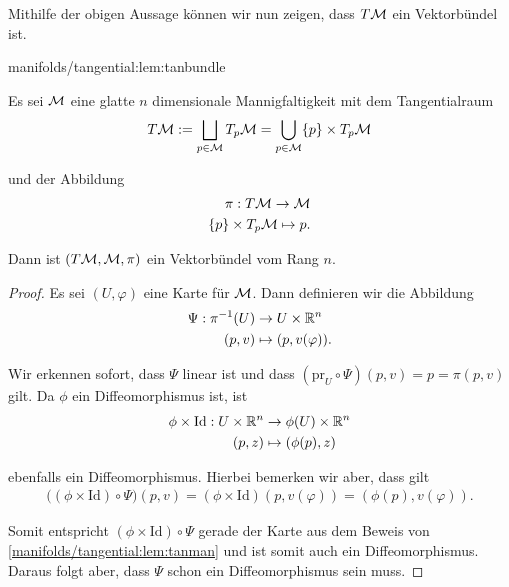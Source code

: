 \par
Mithilfe der obigen Aussage können wir nun zeigen, dass \(T\mathcal{M}\) ein Vektorbündel ist.
\begin{lemma}{}{manifolds/tangential:lem:tanbundle}



\par
Es sei \(\mathcal{M}\) eine glatte \(n\) dimensionale Mannigfaltigkeit mit dem Tangentialraum
\begin{align*}
T\mathcal{M}:= \bigsqcup_{p\in\mathcal{M}}  T_p\mathcal{M} = \bigcup_{p\in\mathcal{M}} \{p\} \times T_p\mathcal{M}
\end{align*}
\par
und der Abbildung
\begin{align*}
\pi:T\mathcal{M}\to \mathcal{M}\\
\{p\}\times T_p\mathcal{M}\mapsto p.
\end{align*}
\par
Dann ist \((T\mathcal{M}, \mathcal{M}, \pi)\) ein Vektorbündel vom Rang \(n\).
\end{lemma}

\begin{proof}
 Es sei \((U,\varphi)\) eine Karte für \(\mathcal{M}\).
Dann definieren wir die Abbildung
\begin{align*}
\Psi: \pi^{-1}(U) &\to U\times \mathbb{R}^n\\
(p,v) &\mapsto (p, v(\varphi)).
\end{align*}
\par
Wir erkennen sofort, dass \(\Psi\) linear ist und dass \((\text{pr}_U\circ\Psi)(p,v) = p = \pi(p,v)\) gilt.
Da \(\phi\) ein Diffeomorphismus ist, ist
\begin{align*}
\phi\times\text{Id}:U\times \mathbb{R}^n &\to \phi(U)\times\mathbb{R}^n\\
(p,z) &\mapsto (\phi(p), z)
\end{align*}
\par
ebenfalls ein Diffeomorphismus.
Hierbei bemerken wir aber, dass gilt
\begin{align*}
\big((\phi\times\text{Id})\circ \Psi\big)(p,v) = (\phi\times\text{Id})(p, v(\varphi)) = (\phi(p), v(\varphi)).
\end{align*}
\par
Somit entspricht \((\phi\times\text{Id})\circ \Psi\) gerade der Karte aus dem Beweis von \cref{manifolds/tangential:lem:tanman} und ist somit auch ein Diffeomorphismus.
Daraus folgt aber, dass \(\Psi\) schon ein Diffeomorphismus sein muss.
\end{proof}



